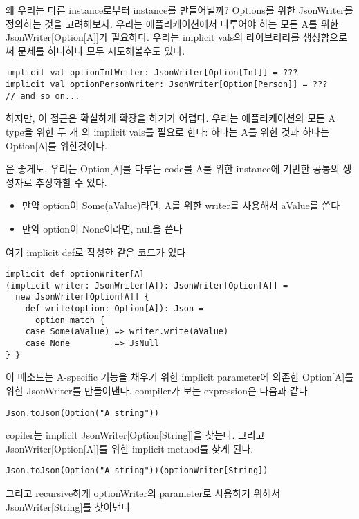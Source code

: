 \documentclass[a4paper]{article}
\begin{document}
왜 우리는 다른 instance로부터 instance를 만들어낼까? Options를 위한 JsonWriter를 정의하는 것을 고려해보자. 우리는 애플리케이션에서 다루어야 하는 모든 A를 위한 JsonWriter[Option[A]]가 필요하다. 우리는 implicit vals의 라이브러리를 생성함으로써 문제를 하나하나 모두 시도해볼수도 있다.

\begin{verbatim}
implicit val optionIntWriter: JsonWriter[Option[Int]] = ???
implicit val optionPersonWriter: JsonWriter[Option[Person]] = ???
// and so on...
\end{verbatim}

하지만, 이 접근은 확실하게 확장을 하기가 어렵다. 우리는 애플리케이션의 모든 A type을 위한 두 개 의 implicit vals를 필요로 한다: 하나는 A를 위한 것과 하나는 Option[A]를 위한것이다.

운 좋게도, 우리는 Option[A]를 다루는 code를 A를 위한 instance에 기반한 공통의 생성자로 추상화할 수 있다.

\begin{itemize}
\item 만약 option이 Some(aValue)라면, A를 위한 writer를 사용해서 aValue를 쓴다
\item 만약 option이 None이라면, null을 쓴다
\end{itemize}

여기 implicit def로 작성한 같은 코드가 있다

\begin{verbatim}
implicit def optionWriter[A]
(implicit writer: JsonWriter[A]): JsonWriter[Option[A]] =
  new JsonWriter[Option[A]] {
    def write(option: Option[A]): Json =
      option match {
	case Some(aValue) => writer.write(aValue)
	case None         => JsNull
} }
\end{verbatim}

이 메소드는 A-specific 기능을 채우기 위한 implicit parameter에 의존한 Option[A]를 위한 JsonWriter를 만들어낸다. compiler가 보는 expression은 다음과 같다

\begin{verbatim}
Json.toJson(Option("A string"))
\end{verbatim}

copiler는 implicit JsonWriter[Option[String]]을 찾는다. 그리고 JsonWriter[Option[A]]를 위한 implicit method를 찾게 된다.

\begin{verbatim}
Json.toJson(Option("A string"))(optionWriter[String])
\end{verbatim}

그리고 recursive하게 optionWriter의 parameter로 사용하기 위해서 JsonWriter[String]를 찾아낸다
\end{document}

